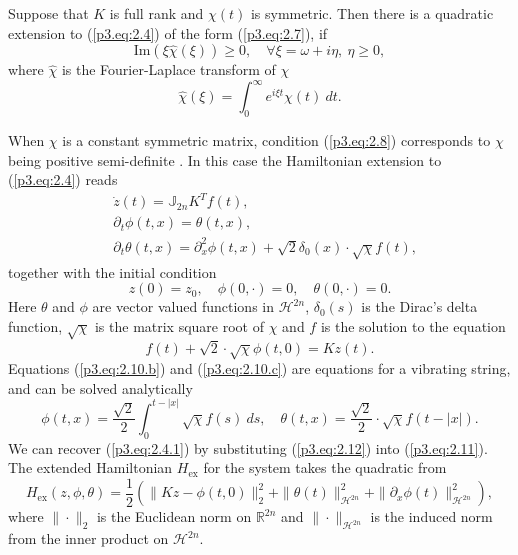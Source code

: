 \begin{theorem} \cite{figotin2007hamiltonian}
Suppose that $K$ is full rank and $\chi(t)$ is symmetric. Then there is a quadratic extension to (\ref{p3.eq:2.4}) of the form (\ref{p3.eq:2.7}), if
\begin{equation} \label{p3.eq:2.8}
	\text{Im}(\xi\hat{\chi}(\xi)) \geq 0, \quad \forall \xi = \omega + i\eta, \ \eta \geq 0,
\end{equation}
where $\hat{\chi}$ is the Fourier-Laplace transform of $\chi$
\begin{equation} \label{p3.eq:2.9}
	\hat{\chi}(\xi) = \int_0^\infty e^{i\xi t} \chi(t)\ dt.
\end{equation}
\end{theorem}
When $\chi$ is a constant symmetric matrix, condition (\ref{p3.eq:2.8}) corresponds to $\chi$ being positive semi-definite \cite{figotin2007hamiltonian}. In this case the Hamiltonian extension to (\ref{p3.eq:2.4}) reads
\begin{subequations}
\begin{align}
		\label{p3.eq:2.10.a} & \dot{z}(t) = \mathbb J_{2n} K^T f(t), \\
		\label{p3.eq:2.10.b} & \partial_t \phi(t,x) = \theta(t,x), \\
		\label{p3.eq:2.10.c} & \partial_t \theta(t,x) = \partial_x^2 \phi(t,x) + \sqrt 2 \delta_0(x) \cdot \sqrt{\chi}  f(t), 
\end{align}
\end{subequations}
together with the initial condition
\begin{equation} \label{p3.eq:2.10.1}
	z(0) = z_0,\quad \phi(0,\cdot) = 0, \quad \theta(0,\cdot) = 0.
\end{equation}
Here $\theta$ and $\phi$ are vector valued functions in $\mathcal H^{2n}$, $\delta_0(s)$ is the Dirac's delta function, $\sqrt{ \chi}$ is the matrix square root of $\chi$ and $f$ is the solution to the equation
\begin{equation} \label{p3.eq:2.11}
	f(t) + \sqrt{2} \cdot \sqrt{ \chi } \phi(t,0) = Kz(t).
\end{equation}
Equations (\ref{p3.eq:2.10.b}) and (\ref{p3.eq:2.10.c}) are equations for a vibrating string, and can be solved analytically
\begin{equation} \label{p3.eq:2.12}
	\phi(t,x) = \frac {\sqrt 2} 2 \int_0^{t-|x|} \sqrt{\chi} f(s)\ ds,\quad \theta(t,x) = \frac{\sqrt 2}{2} \cdot \sqrt{\chi} f(t - |x|).
\end{equation}
We can recover (\ref{p3.eq:2.4.1}) by substituting (\ref{p3.eq:2.12}) into (\ref{p3.eq:2.11}). The extended Hamiltonian $H_\text{ex}$ for the system  takes the quadratic from
\begin{equation} \label{p3.eq:2.13}
	H_\text{ex}(z,\phi,\theta) = \frac 1 2 \left( \| Kz - \phi(t,0) \|_2^2 + \| \theta(t) \|^2_{\mathcal H^{2n} } + \| \partial_x\phi(t)\|^2_{\mathcal H^{2n} }\right),
\end{equation}
where $\| \cdot \|_2$ is the Euclidean norm on $\mathbb R^{2n}$ and $\| \cdot \|_{\mathcal H^{2n}}$ is the induced norm from the inner product on $\mathcal H^{2n}$. 

